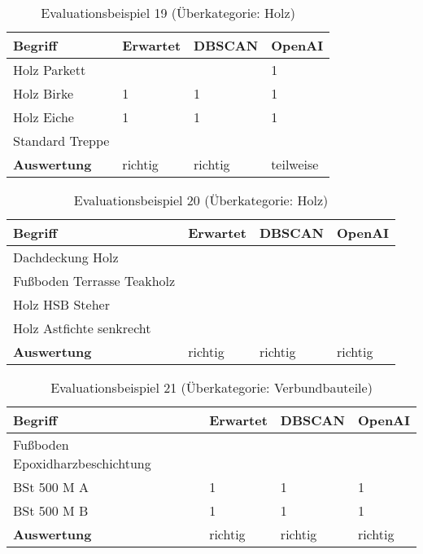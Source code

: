 \begin{table}[h]
	
	\centering
	\begin{tabular}{|l|l|l|l|}
		\hline
		\textbf{Begriff} & \textbf{Erwartet} & \textbf{DBSCAN} & \textbf{OpenAI}\\ \hline
		 Holz Parkett & ~ & ~ & 1 \\ \hline
		Holz Birke & 1 & 1 & 1 \\ \hline
		Holz Eiche & 1 & 1 & 1 \\ \hline
		Standard Treppe & ~ & ~ & ~ \\ \hline
		\textbf{Auswertung} & richtig & richtig & teilweise \\ \hline
	\end{tabular}
	\caption{Evaluationsbeispiel 19 (Überkategorie: Holz)}
	\label{t:evaluation-example19}
\end{table}

\begin{table}[h]
	
	\centering
	\begin{tabular}{|l|l|l|l|}
		\hline
		\textbf{Begriff} & \textbf{Erwartet} & \textbf{DBSCAN} & \textbf{OpenAI}\\ \hline
		  Dachdeckung Holz & ~ & ~ & ~ \\ \hline
		Fußboden Terrasse Teakholz & ~ & ~ & ~ \\ \hline
		Holz HSB Steher & ~ & ~ & ~ \\ \hline
		Holz Astfichte senkrecht & ~ & ~ & ~ \\ \hline
		\textbf{Auswertung} & richtig & richtig & richtig \\ \hline
	\end{tabular}
	\caption{Evaluationsbeispiel 20 (Überkategorie: Holz)}
	\label{t:evaluation-example20}
\end{table}

\begin{table}[h]
	
	\centering
	\begin{tabular}{|l|l|l|l|}
		\hline
		\textbf{Begriff} & \textbf{Erwartet} & \textbf{DBSCAN} & \textbf{OpenAI}\\ \hline
		 Fußboden Epoxidharzbeschichtung & ~ & ~ & ~ \\ \hline
		BSt 500 M A & 1 & 1 & 1 \\ \hline
		BSt 500 M B & 1 & 1 & 1 \\ \hline
		\textbf{Auswertung} & richtig & richtig & richtig\\ \hline
	\end{tabular}
	\caption{Evaluationsbeispiel 21 (Überkategorie: Verbundbauteile)}
	\label{t:evaluation-example21}
\end{table}

